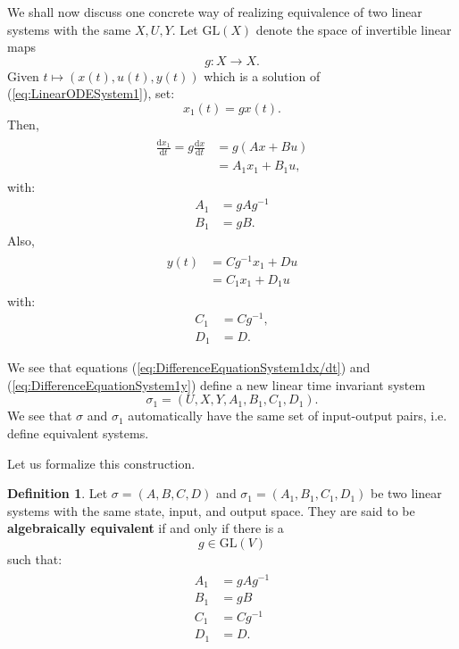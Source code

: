 \documentclass[12pt]{book}
\theoremstyle{plain}
\theoremstyle{definition}
\newtheorem{definition}{Definition}[section]
\newcommand{\dd}[1]{\mathrm{d}#1}
\begin{document}
We shall now discuss one concrete way of realizing equivalence of two linear systems with the same $X, U, Y$.
Let $\mathrm{GL}(X)$ denote the space of invertible linear maps
$$g: X \to X.$$
Given $t \mapsto (x(t), u(t), y(t))$ which is a solution of (\ref{eq:LinearODESystem1}), set:
$$x_1(t) = gx(t).$$
Then,
\begin{align}
\begin{split} \label{eq:DifferenceEquationSystem1dx/dt}
    \frac{\dd{x_1}}{\dd{t}} = g\frac{\dd{x}}{\dd{t}} &= g(Ax + Bu) \\
    &= A_1x_1 + B_1u,
\end{split}
\end{align}
with:
\begin{align}
    A_1 &= gAg^{-1} \\
    B_1 &= gB.
\end{align}
Also,
\begin{align}
\begin{split} \label{eq:DifferenceEquationSystem1y}
    y(t) &= Cg^{-1}x_1 + Du \\
    &= C_1x_1 + D_1u
\end{split}
\end{align}
with:
\begin{align}
    C_1 &= Cg^{-1}, \label{eq:C1,1} \\
    D_1 &= D.
\end{align}

We see that equations (\ref{eq:DifferenceEquationSystem1dx/dt}) and (\ref{eq:DifferenceEquationSystem1y}) define a new linear time invariant system
$$\sigma_1 = (U, X, Y, A_1, B_1, C_1, D_1).$$
We see that $\sigma$ and $\sigma_1$ automatically have the same set of input-output pairs, i.e. define equivalent systems.

Let us formalize this construction.

\begin{definition}
    Let $\sigma = (A, B, C, D)$ and $\sigma_1 = (A_1, B_1, C_1, D_1)$ be two linear systems with the same state, input, and output space.
    They are said to be \textbf{algebraically equivalent} if and only if there is a
    $$g \in \textrm{GL}(V)$$
    such that:
    \begin{align}
    \begin{split}
        A_1 &= gAg^{-1} \\
        B_1 &= gB \\
        C_1 &= Cg^{-1} \\
        D_1 &= D.
    \end{split}
    \end{align}
\end{definition}
\end{document}
